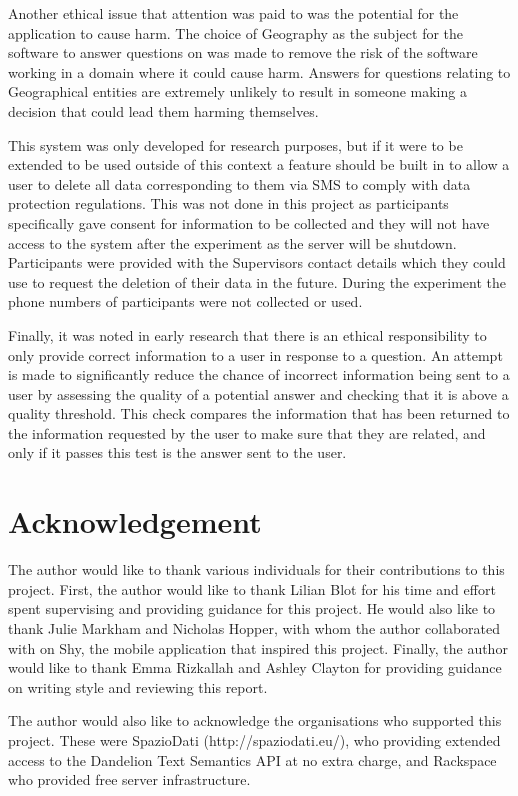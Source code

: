 \documentclass[authoryearcitations]{UoYCSproject}
\begin{document}
Another ethical issue that attention was paid to was the potential for the application to cause harm. The choice of Geography as the subject for the software to answer questions on was made to remove the risk of the software working in a domain where it could cause harm. Answers for questions relating to Geographical entities are extremely unlikely to result in someone making a decision that could lead them harming themselves.

This system was only developed for research purposes, but if it were to be extended to be used outside of this context a feature should be built in to allow a user to delete all data corresponding to them via SMS to comply with data protection regulations. This was not done in this project as participants specifically gave consent for information to be collected and they will not have access to the system after the experiment as the server will be shutdown. Participants were provided with the Supervisors contact details which they could use to request the deletion of their data in the future. During the experiment the phone numbers of participants were not collected or used.

Finally, it was noted in early research that there is an ethical responsibility to only provide correct information to a user in response to a question. An attempt is made to significantly reduce the chance of incorrect information being sent to a user by assessing the quality of a potential answer and checking that it is above a quality threshold. This check compares the information that has been returned to the information requested by the user to make sure that they are related, and only if it passes this test is the answer sent to the user.

\newpage
\chapter*{Acknowledgement}
The author would like to thank various individuals for their contributions to this project. First, the author would like to thank Lilian Blot for his time and effort spent supervising and providing guidance for this project. He would also like to thank Julie Markham and Nicholas Hopper, with whom the author collaborated with on Shy, the mobile application that inspired this project. Finally, the author would like to thank Emma Rizkallah and Ashley Clayton for providing guidance on writing style and reviewing this report.

The author would also like to acknowledge the organisations who supported this project. These were SpazioDati (http://spaziodati.eu/), who providing extended access to the Dandelion Text Semantics API at no extra charge, and Rackspace who provided free server infrastructure.
\end{document}

